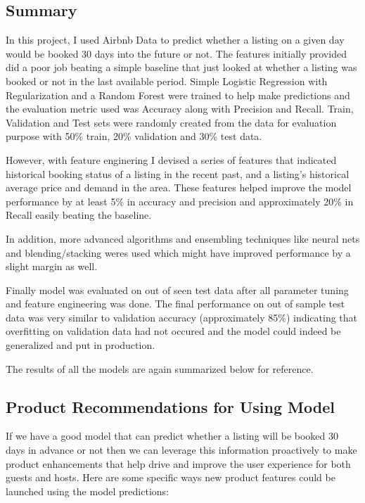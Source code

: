 \documentclass[11pt]{article}
\begin{document}
\subsection{Summary}\label{summary}

In this project, I used Airbnb Data to predict whether a listing on a
given day would be booked 30 days into the future or not. The features
initially provided did a poor job beating a simple baseline that just
looked at whether a listing was booked or not in the last available
period. Simple Logistic Regression with Regularization and a Random
Forest were trained to help make predictions and the evaluation metric
used was Accuracy along with Precision and Recall. Train, Validation and
Test sets were randomly created from the data for evaluation purpose
with 50\% train, 20\% validation and 30\% test data.

However, with feature enginering I devised a series of features that
indicated historical booking status of a listing in the recent past, and
a listing's historical average price and demand in the area. These
features helped improve the model performance by at least 5\% in
accuracy and precision and approximately 20\% in Recall easily beating
the baseline.

In addition, more advanced algorithms and ensembling techniques like
neural nets and blending/stacking weres used which might have improved
performance by a slight margin as well.

Finally model was evaluated on out of seen test data after all parameter
tuning and feature engineering was done. The final performance on out of
sample test data was very similar to validation accuracy (approximately
85\%) indicating that overfitting on validation data had not occured and
the model could indeed be generalized and put in production.

The results of all the models are again summarized below for reference.

    \subsection{Product Recommendations for Using
Model}\label{product-recommendations-for-using-model}

If we have a good model that can predict whether a listing will be
booked 30 days in advance or not then we can leverage this information
proactively to make product enhancements that help drive and improve the
user experience for both guests and hosts. Here are some specific ways
new product features could be launched using the model predictions:
\end{document}
